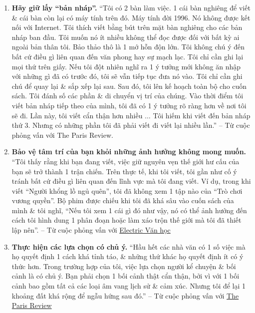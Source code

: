 \documentclass[oneside]{book}
\numberwithin{equation}{section}
\begin{document}
\begin{enumerate}
	\item \textbf{Hãy giữ lấy ``bản nháp''.} ``Tôi có 2 bàn làm việc. 1 cái bàn nghiêng để viết \& cái bàn còn lại có máy tính trên đó. Máy tính đời 1996. Nó không được kết nối với Internet. Tôi thích viết bằng bút trên mặt bàn nghiêng cho các bản nháp ban đầu. Tôi muốn nó ít nhiều không thể đọc được đối với bất kỳ ai ngoài bản thân tôi. Bảo thảo thô là 1 mớ hỗn độn lớn. Tôi không chú ý đến bất cứ điều gì liên quan đến văn phong hay sự mạch lạc. Tôi chỉ cần ghi lại mọi thứ trên giấy. Nếu tôi đột nhiên nghĩ ra 1 ý tưởng mới không ăn nhập với những gì đã có trước đó, tôi sẽ vẫn tiếp tục đưa nó vào. Tôi chỉ cần ghi chú để quay lại \& sắp xếp lại sau. Sau đó, tôi lên kế hoạch toàn bộ cho cuốn sách. Tôi đánh số các phần \& di chuyển vị trí của chúng. Vào thời điểm tôi viết bản nháp tiếp theo của mình, tôi đã có 1 ý tưởng rõ ràng hơn về nơi tôi sẽ đi. Lần này, tôi viết cẩn thận hơn nhiều $\ldots$ Tôi hiếm khi viết đến bản nháp thứ 3. Nhưng có những phần tôi đã phải viết đi viết lại nhiều lần.'' -- Từ cuộc phỏng vấn với The Paris Review.
	\item \textbf{Bảo vệ tâm trí của bạn khỏi những ảnh hưởng không mong muốn.} ``Tôi thấy rằng khi bạn đang viết, việc giữ nguyên vẹn thế giới hư cấu của bạn sẽ trở thành 1 trận chiến. Trên thực tế, khi tôi viết, tôi gần như cố ý tránh bất cứ điều gì liên quan đến lĩnh vực mà tôi đang viết. Ví dụ, trong khi viết ``Người khổng lồ ngủ quên'', tôi đã không xem 1 tập nào của ``Trò chơi vương quyền''. Bộ phim được chiếu khi tôi đã khá sâu vào cuốn sách của mình \& tôi nghĩ, ``Nếu tôi xem 1 cái gì đó như vậy, nó có thể ảnh hưởng đến cách tôi hình dung 1 phân đoạn hoặc làm xáo trộn thế giới mà tôi đã thiết lập nên''. -- Từ cuộc phỏng vấn với \href{https://electricliterature.com/a-language-that-conceals-an-interview-with-kazuo-ishiguro-author-of-the-buried-giant-9673849885c7}{Electric Văn học}
	\item \textbf{Thực hiện các lựa chọn có chủ ý.} ``Hầu hết các nhà văn có 1 số việc mà họ quyết định 1 cách khá tỉnh táo, \& những thứ khác họ quyết định ít có ý thức hơn. Trong trường hợp của tôi, việc lựa chọn người kể chuyện \& bối cảnh là có chủ ý. Bạn phải chọn 1 bối cảnh thật cẩn thận, bởi vì với 1 bối cảnh bao gồm tất cả các loại âm vang lịch sử \& cảm xúc. Nhưng tôi để lại 1 khoảng đất khá rộng để ngẫu hứng sau đó.'' -- Từ cuộc phỏng vấn với \href{https://www.theparisreview.org/interviews/5829/kazuo-ishiguro-the-art-of-fiction-no-196-kazuo-ishiguro}{The Paris Review}

\end{enumerate}
\end{document}
